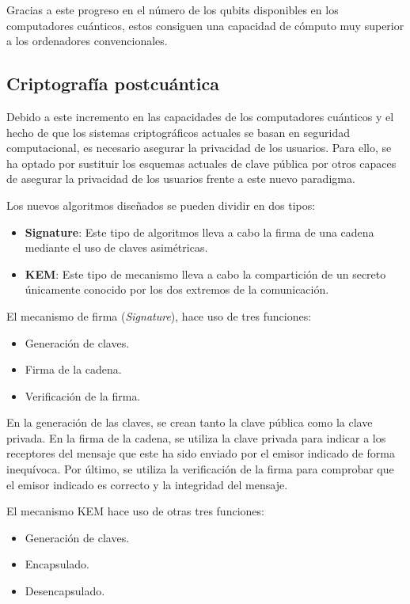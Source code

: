 Gracias a este progreso en el número de los qubits disponibles en los computadores cuánticos, estos consiguen una capacidad de cómputo muy superior a los ordenadores convencionales.


\subsection{Criptografía postcuántica}\label{subsec:postcuantica}

Debido a este incremento en las capacidades de los computadores cuánticos y el hecho de que los sistemas criptográficos actuales se basan en seguridad computacional, es necesario asegurar la privacidad de los usuarios.
Para ello, se ha optado por sustituir los esquemas actuales de clave pública por otros capaces de asegurar la privacidad de los usuarios frente a este nuevo paradigma.

Los nuevos algoritmos diseñados se pueden dividir en dos tipos:

\begin{itemize}
    \item \textbf{Signature}: Este tipo de algoritmos lleva a cabo la firma de una cadena mediante el uso de claves asimétricas.
    \item \textbf{\ac{KEM}}: Este tipo de mecanismo lleva a cabo la compartición de un secreto únicamente conocido por los dos extremos de la comunicación.
\end{itemize}

El mecanismo de firma (\textit{Signature}), hace uso de tres funciones:

\begin{itemize}
    \item Generación de claves.
    \item Firma de la cadena.
    \item Verificación de la firma.
\end{itemize}

En la generación de las claves, se crean tanto la clave pública como la clave privada.
En la firma de la cadena, se utiliza la clave privada para indicar a los receptores del mensaje que este ha sido enviado por el emisor indicado de forma inequívoca.
Por último, se utiliza la verificación de la firma para comprobar que el emisor indicado es correcto y la integridad del mensaje.

El mecanismo \ac{KEM} hace uso de otras tres funciones:

\begin{itemize}
    \item Generación de claves.
    \item Encapsulado.
    \item Desencapsulado.
\end{itemize}

